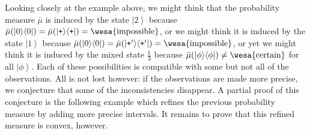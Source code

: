 \documentclass{article}
\theoremstyle{remark}
\newcommand{\imposs}{{\mbox{\wesa{impossible}}}}
\newcommand{\necess}{{\mbox{\wesa{certain}}}}
\newcommand{\ket}[1]{{\left\vert{#1}\right\rangle}}
\newcommand{\op}[2]{\ensuremath{\left\vert{#1}\middle\rangle\middle\langle{#2}\right\vert}}
\newcommand{\proj}[1]{\op{#1}{#1}}
\newcommand{\ps}{\texttt{+}}
\begin{document}
Looking closely at the example above, we might think that the probability
measure $\bar{\mu}$ is induced by the state $\ket{2}$ because $\bar{\mu}(\proj{0})=\bar{\mu}(\proj{\ps})=\imposs$,
or we might think it is induced by the state $\ket{1}$ because $\bar{\mu}(\proj{0})=\bar{\mu}(\proj{\ps'})=\imposs$,
or yet we might think it is induced by the mixed state $\frac{\mathbb{1}}{3}$
because $\bar{\mu}(\proj{\phi})\ne\necess$ for all $\ket{\phi}$.
Each of these possibilities is compatible with some but not all of
the observations. All is not lost however: if the observations are
made more precise, we conjecture that some of the inconsistencies
disappear. A partial proof of this conjecture is the following example
which refines the previous probability measure by adding more precise
intervals. It remains to prove that this refined measure is convex,
however.
\end{document}
